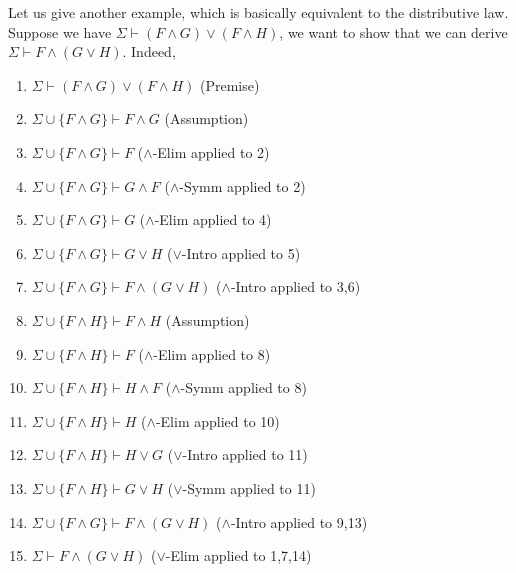 \begin{prooftree}
\end{prooftree}

Let us give another example, which is basically equivalent to the distributive law. Suppose we have $\Sigma\vdash (F\wedge G)\vee(F\wedge H)$, we want to show that we can derive $\Sigma\vdash F\wedge(G\vee H)$. Indeed,
\begin{enumerate}
    \item $\Sigma\vdash (F\wedge G)\vee(F\wedge H)$ \hfill (\textsf{Premise})%
    
    \item $\Sigma\cup\{F\wedge G\} \vdash F\wedge G$ \hfill (\textsf{Assumption})%
    \item $\Sigma\cup\{F\wedge G\} \vdash F$ \hfill (\textsf{$\wedge$-Elim} applied to 2)%
    \item $\Sigma\cup\{F\wedge G\} \vdash G\wedge F$ \hfill (\textsf{$\wedge$-Symm} applied to 2)%
    \item $\Sigma\cup\{F\wedge G\} \vdash G$ \hfill (\textsf{$\wedge$-Elim} applied to 4)%
    \item $\Sigma\cup\{F\wedge G\}\vdash G\vee H$ \hfill (\textsf{$\vee$-Intro} applied to 5)%
    \item $\Sigma\cup\{F\wedge G\}\vdash F\wedge(G\vee H)$ \hfill (\textsf{$\wedge$-Intro} applied to 3,6)%

    \item $\Sigma\cup\{F\wedge H\} \vdash F\wedge H$ \hfill (\textsf{Assumption})%
    \item $\Sigma\cup\{F\wedge H\} \vdash F$ \hfill (\textsf{$\wedge$-Elim} applied to 8)%
    \item $\Sigma\cup\{F\wedge H\} \vdash H\wedge F$ \hfill (\textsf{$\wedge$-Symm} applied to 8)%
    \item $\Sigma\cup\{F\wedge H\} \vdash H$ \hfill (\textsf{$\wedge$-Elim} applied to 10)%
    \item $\Sigma\cup\{F\wedge H\}\vdash H\vee G$ \hfill (\textsf{$\vee$-Intro} applied to 11)%
    \item $\Sigma\cup\{F\wedge H\}\vdash G\vee H$ \hfill (\textsf{$\vee$-Symm} applied to 11)%
    \item $\Sigma\cup\{F\wedge G\}\vdash F\wedge(G\vee H)$ \hfill (\textsf{$\wedge$-Intro} applied to 9,13)%

    \item $\Sigma\vdash F\wedge(G\vee H)$ \hfill (\textsf{$\vee$-Elim} applied to 1,7,14)%
\end{enumerate}

